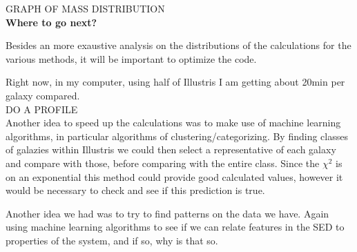 \documentclass[11pt]{report}
\begin{document}
GRAPH OF MASS DISTRIBUTION\\

{\bf Where to go next?}

Besides an more exaustive analysis on the distributions of the calculations for the various methods, it will be important to optimize the code.

Right now, in my computer, using half of Illustris I am getting about 20min per galaxy compared.\\

DO A PROFILE\\

Another idea to speed up the calculations was to make use of machine learning algorithms, in particular algorithms of clustering/categorizing. By finding classes of galazies within Illustris we could then select a representative of each galaxy and compare with those, before comparing with the entire class. Since the $\chi^2$ is on an exponential this method could provide good calculated values, however it would be necessary to check and see if this prediction is true.

Another idea we had was to try to find patterns on the data we have. Again using machine learning algorithms to see if we can relate features in the SED to properties of the system, and if so, why is that so.
\end{document}
